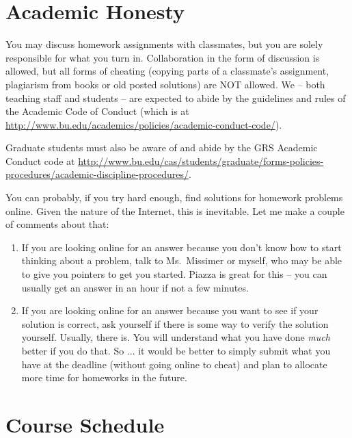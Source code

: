 \documentclass[11pt]{article}
\begin{document}
\newpage

\section*{Academic Honesty}

You may discuss homework assignments with classmates, but you are 
solely responsible for what you turn in. Collaboration in the form of
discussion is allowed, but all forms of cheating (copying parts of a
classmate's assignment, plagiarism from books or old posted solutions)
are NOT allowed. We -- both teaching staff and students -- are expected
to abide by the guidelines and rules of the Academic Code of Conduct
(which is at
\url{http://www.bu.edu/academics/policies/academic-conduct-code/}).

Graduate students must also be aware of and abide by the GRS Academic
Conduct code at \url{http://www.bu.edu/cas/students/graduate/forms-policies-procedures/academic-discipline-procedures/}.

You can probably, if you try hard enough, find solutions for homework
problems online.    Given the nature of the Internet, this is
inevitable.   Let me make a couple of comments about that:
\begin{enumerate}
\item If you are looking online for an answer because you don't know how
  to start thinking about a problem, talk to Ms.\ Missimer or myself, who may be
  able to give you pointers to get you started.  Piazza is great for
  this -- you can usually get an answer in an hour if not a few minutes.
\item If you are looking online for an answer because you want to see if
  your solution is correct, ask yourself if there is some way to verify
  the solution yourself.   Usually, there is.  You will understand what you have done
  \emph{much} better if you do that.
So ... it would be better to simply submit what you have at the deadline
(without going online to cheat) and plan to allocate more time for
homeworks in the future.
\end{enumerate}

\newpage
\section*{Course Schedule}
\end{document}

